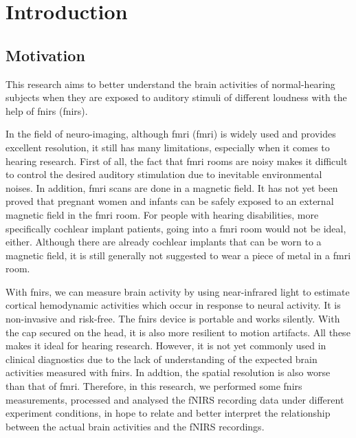 \chapter{Introduction}

\section{Motivation}
This research aims to better understand the brain activities of normal-hearing subjects when they are exposed to auditory stimuli of different loudness with the help of \acrlong{fnirs} (\acrshort{fnirs}).

In the field of neuro-imaging, although \acrlong{fmri}  (\acrshort{fmri})  is widely used and provides excellent resolution, it still has many limitations, especially when it comes to hearing research. First of all, the fact that \acrshort{fmri} rooms are noisy makes it difficult to control the desired auditory stimulation due to inevitable environmental noises. In addition, \acrshort{fmri} scans are done in a magnetic field. It has not yet been proved that pregnant women and infants can be safely exposed to an external magnetic field in the \acrshort{fmri} room. For people with hearing disabilities, more specifically cochlear implant patients, going into a \acrshort{fmri} room would not be ideal, either. Although there are already cochlear implants that can be worn to a magnetic field, it is still generally not suggested to wear a piece of metal in a \acrshort{fmri} room.

With \acrshort{fnirs}, we can measure brain activity by using near-infrared light to estimate cortical hemodynamic activities which occur in response to neural activity. It is non-invasive and risk-free. The \acrshort{fnirs} device is portable and works silently. With the cap secured on the head, it is also more resilient to motion artifacts. All these makes it ideal for hearing research. However, it is not yet commonly used in clinical diagnostics due to the lack of understanding of the expected brain activities measured with \acrshort{fnirs}. In addtion, the spatial resolution is also worse than that of \acrshort{fmri}. Therefore, in this research, we performed some \acrshort{fnirs} measurements, processed and analysed the fNIRS recording data under different experiment conditions, in hope to relate and better interpret the relationship between the actual brain activities and the fNIRS recordings.

